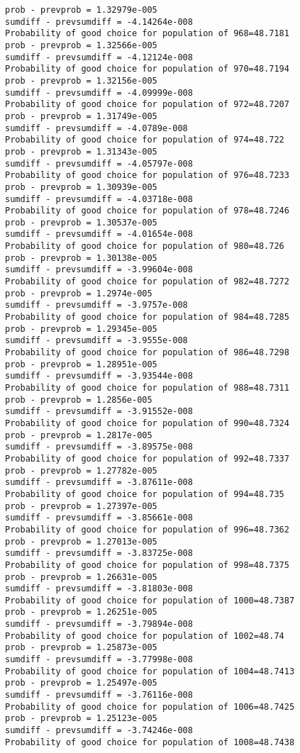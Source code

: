 \documentclass[11pt,onecolumn]{article}
\begin{document}
\begin{verbatim}
prob - prevprob = 1.32979e-005
sumdiff - prevsumdiff = -4.14264e-008
Probability of good choice for population of 968=48.7181
prob - prevprob = 1.32566e-005
sumdiff - prevsumdiff = -4.12124e-008
Probability of good choice for population of 970=48.7194
prob - prevprob = 1.32156e-005
sumdiff - prevsumdiff = -4.09999e-008
Probability of good choice for population of 972=48.7207
prob - prevprob = 1.31749e-005
sumdiff - prevsumdiff = -4.0789e-008
Probability of good choice for population of 974=48.722
prob - prevprob = 1.31343e-005
sumdiff - prevsumdiff = -4.05797e-008
Probability of good choice for population of 976=48.7233
prob - prevprob = 1.30939e-005
sumdiff - prevsumdiff = -4.03718e-008
Probability of good choice for population of 978=48.7246
prob - prevprob = 1.30537e-005
sumdiff - prevsumdiff = -4.01654e-008
Probability of good choice for population of 980=48.726
prob - prevprob = 1.30138e-005
sumdiff - prevsumdiff = -3.99604e-008
Probability of good choice for population of 982=48.7272
prob - prevprob = 1.2974e-005
sumdiff - prevsumdiff = -3.9757e-008
Probability of good choice for population of 984=48.7285
prob - prevprob = 1.29345e-005
sumdiff - prevsumdiff = -3.9555e-008
Probability of good choice for population of 986=48.7298
prob - prevprob = 1.28951e-005
sumdiff - prevsumdiff = -3.93544e-008
Probability of good choice for population of 988=48.7311
prob - prevprob = 1.2856e-005
sumdiff - prevsumdiff = -3.91552e-008
Probability of good choice for population of 990=48.7324
prob - prevprob = 1.2817e-005
sumdiff - prevsumdiff = -3.89575e-008
Probability of good choice for population of 992=48.7337
prob - prevprob = 1.27782e-005
sumdiff - prevsumdiff = -3.87611e-008
Probability of good choice for population of 994=48.735
prob - prevprob = 1.27397e-005
sumdiff - prevsumdiff = -3.85661e-008
Probability of good choice for population of 996=48.7362
prob - prevprob = 1.27013e-005
sumdiff - prevsumdiff = -3.83725e-008
Probability of good choice for population of 998=48.7375
prob - prevprob = 1.26631e-005
sumdiff - prevsumdiff = -3.81803e-008
Probability of good choice for population of 1000=48.7387
prob - prevprob = 1.26251e-005
sumdiff - prevsumdiff = -3.79894e-008
Probability of good choice for population of 1002=48.74
prob - prevprob = 1.25873e-005
sumdiff - prevsumdiff = -3.77998e-008
Probability of good choice for population of 1004=48.7413
prob - prevprob = 1.25497e-005
sumdiff - prevsumdiff = -3.76116e-008
Probability of good choice for population of 1006=48.7425
prob - prevprob = 1.25123e-005
sumdiff - prevsumdiff = -3.74246e-008
Probability of good choice for population of 1008=48.7438

\end{verbatim}
\end{document}

